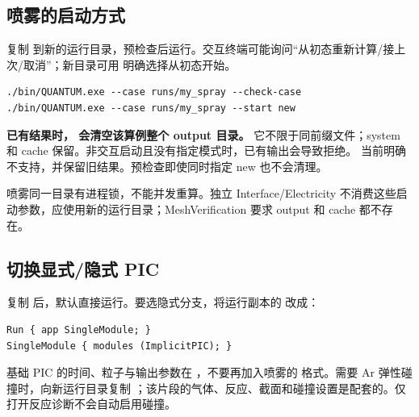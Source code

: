 \documentclass[a4paper,11pt]{article}
\begin{document}
\subsection{喷雾的启动方式}
复制  到新的运行目录，预检查后运行。交互终端可能询问“从初态重新计算/接上次/取消”；新目录可用  明确选择从初态开始。
\begin{lstlisting}
./bin/QUANTUM.exe --case runs/my_spray --check-case
./bin/QUANTUM.exe --case runs/my_spray --start new
\end{lstlisting}
\textbf{已有结果时， 会清空该算例整个 output 目录。} 它不限于同前缀文件；system 和 cache 保留。非交互启动且没有指定模式时，已有输出会导致拒绝。 当前明确不支持，并保留旧结果。预检查即使同时指定 new 也不会清理。

喷雾同一目录有进程锁，不能并发重算。独立 Interface/Electricity 不消费这些启动参数，应使用新的运行目录；MeshVerification 要求 output 和 cache 都不存在。

\subsection{切换显式/隐式 PIC}
复制  后，默认直接运行。要选隐式分支，将运行副本的  改成：
\begin{lstlisting}
Run { app SingleModule; }
SingleModule { modules (ImplicitPIC); }
\end{lstlisting}
基础 PIC 的时间、粒子与输出参数在 ，不要再加入喷雾的  格式。需要 Ar 弹性碰撞时，向新运行目录复制 ；该片段的气体、反应、截面和碰撞设置是配套的。仅打开反应诊断不会自动启用碰撞。
\end{document}
